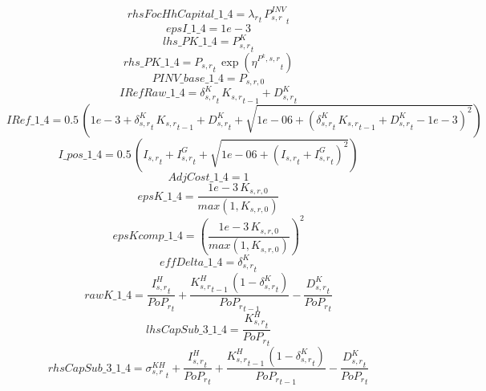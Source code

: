 \begin{dmath*}
rhsFocHhCapital\_1\_4 = {\lambda_r}_{t}\, {{P^{INV}_{s,r}}}_{t}
\end{dmath*}
\begin{dmath*}
epsI\_1\_4 = 1e-3
\end{dmath*}
\begin{dmath*}
lhs\_PK\_1\_4 = {{P^K_{s,r}}}_{t}
\end{dmath*}
\begin{dmath*}
rhs\_PK\_1\_4 = {{P_{s,r}}}_{t}\, \exp\left({{\eta^{P^k,s,r}}}_{t}\right)
\end{dmath*}
\begin{dmath*}
PINV\_base\_1\_4 = {{P_{s,r,0}}}
\end{dmath*}
\begin{dmath*}
IRefRaw\_1\_4 = {{\delta^{K}_{s,r}}}_{t}\, {{K_{s,r}}}_{t-1}+{{D^K_{s,r}}}_{t}
\end{dmath*}
\begin{dmath*}
IRef\_1\_4 = 0.5\, \left(1e-3+{{\delta^{K}_{s,r}}}_{t}\, {{K_{s,r}}}_{t-1}+{{D^K_{s,r}}}_{t}+\sqrt{1e-06+\left({{\delta^{K}_{s,r}}}_{t}\, {{K_{s,r}}}_{t-1}+{{D^K_{s,r}}}_{t}-1e-3\right)^{2}}\right)
\end{dmath*}
\begin{dmath*}
I\_pos\_1\_4 = 0.5\, \left({{I_{s,r}}}_{t}+{{I^G_{s,r}}}_{t}+\sqrt{1e-06+\left({{I_{s,r}}}_{t}+{{I^G_{s,r}}}_{t}\right)^{2}}\right)
\end{dmath*}
\begin{dmath*}
AdjCost\_1\_4 = 1
\end{dmath*}
\begin{dmath*}
epsK\_1\_4 = \frac{1e-3\, {{K_{s,r,0}}}}{max(1,{{K_{s,r,0}}})}
\end{dmath*}
\begin{dmath*}
epsKcomp\_1\_4 = \left(\frac{1e-3\, {{K_{s,r,0}}}}{max(1,{{K_{s,r,0}}})}\right)^{2}
\end{dmath*}
\begin{dmath*}
effDelta\_1\_4 = {{\delta^{K}_{s,r}}}_{t}
\end{dmath*}
\begin{dmath*}
rawK\_1\_4 = \frac{{{I^H_{s,r}}}_{t}}{{{PoP_r}}_{t}}+\frac{{{K^H_{s,r}}}_{t-1}\, \left(1-{{\delta^{K}_{s,r}}}_{t}\right)}{{{PoP_r}}_{t-1}}-\frac{{{D^K_{s,r}}}_{t}}{{{PoP_r}}_{t}}
\end{dmath*}
\begin{dmath*}
lhsCapSub\_3\_1\_4 = \frac{{{K^H_{s,r}}}_{t}}{{{PoP_r}}_{t}}
\end{dmath*}
\begin{dmath*}
rhsCapSub\_3\_1\_4 = {{\sigma^{KH}_{s,r}}}_{t}+\frac{{{I^H_{s,r}}}_{t}}{{{PoP_r}}_{t}}+\frac{{{K^H_{s,r}}}_{t-1}\, \left(1-{{\delta^{K}_{s,r}}}_{t}\right)}{{{PoP_r}}_{t-1}}-\frac{{{D^K_{s,r}}}_{t}}{{{PoP_r}}_{t}}
\end{dmath*}
